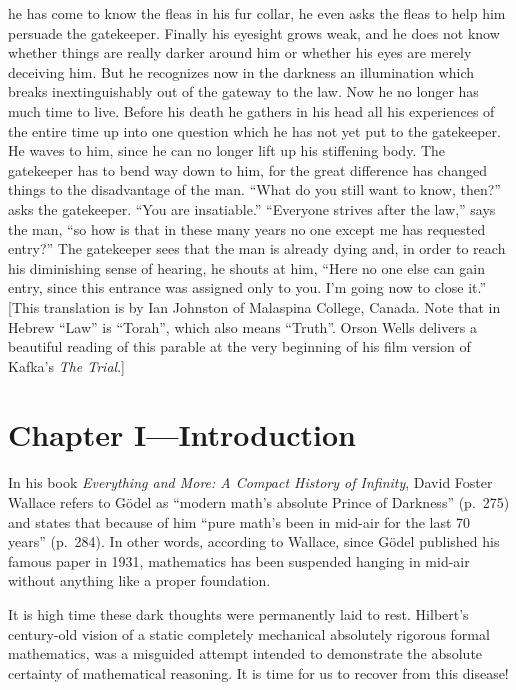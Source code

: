 \documentclass[12pt]{book}
\begin{document}
he has come to know the fleas in his fur collar, he even asks the fleas to help
him persuade the gatekeeper. Finally
his eyesight grows weak, and he does not know whether things are really darker
around him or whether his eyes are merely deceiving him.
But he recognizes now in the darkness an illumination which
breaks inextinguishably out of the gateway to the law.
Now he no longer has much time to live.
Before his death he gathers in his head all his experiences of the entire
time up into one question which he has not yet put to the gatekeeper.
He waves to him, since he can no longer lift up his stiffening body.
The gatekeeper has to bend way down to him, for the great
difference has changed things to the disadvantage of the man. ``What do you
still want to know, then?'' asks the gatekeeper. ``You are insatiable.''
``Everyone strives after the law,'' says the man, ``so how is that in
these many years no one except me has requested entry?''
The gatekeeper sees that the man is already dying and, in order to reach
his diminishing sense of hearing, he shouts at him, ``Here no one else can gain
entry, since this entrance was assigned only to you.
I'm going now to close it.''
\vspace{\baselineskip}
\\
{\footnotesize
[This translation is by Ian Johnston of Malaspina College, Canada. 
Note that in Hebrew ``Law'' is ``Torah'', which also means ``Truth''.
Orson Wells delivers a beautiful reading of this parable 
at the very beginning of his film
version of Kafka's \emph{The Trial}.]}

\chapter*{Chapter I---Introduction}

In his book \emph{Everything and More: A Compact History of Infinity}, 
David Foster Wallace refers to G\"odel as
``modern math's absolute Prince of Darkness'' (p.\ 275) and states that 
because of him
``pure math's been in mid-air for the last 70 years'' (p.\ 284). 
In other words, according to Wallace, 
since G\"odel published his famous paper in 1931, mathematics has been
suspended hanging in mid-air without anything like a proper foundation.

It is high time 
these dark thoughts were permanently laid to rest.
Hilbert's century-old vision of a static completely mechanical 
absolutely rigorous formal mathematics, was a misguided attempt intended to
demonstrate the absolute certainty of mathematical reasoning.
It is time for us to recover from this disease!  
\end{document}
